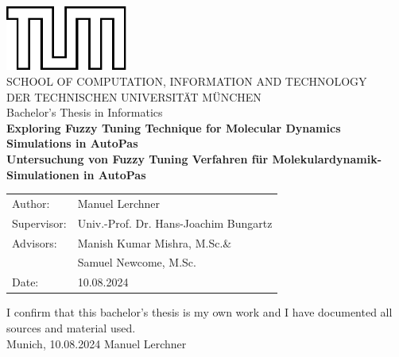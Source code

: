 \documentclass[11pt,
               a4paper,
               bibtotoc,
               idxtotoc,
               headsepline,
               footsepline,
               footexclude,
               BCOR12mm,
               DIV13,
               openany,   %
               ]
               {scrbook}
\def\doctype{Bachelor's Thesis\xspace}
\def\studyProgram{Informatics}
\def\title{Exploring Fuzzy Tuning Technique for Molecular Dynamics Simulations in AutoPas}
\def\titleGer{Untersuchung von Fuzzy Tuning Verfahren für Molekulardynamik-Simulationen in AutoPas}
\def\author{Manuel Lerchner}
\def\supervisor{Univ.-Prof. Dr. Hans-Joachim Bungartz}
\def\advisorFst{Manish Kumar Mishra, M.Sc.}
\def\advisorSnd{Samuel Newcome, M.Sc.}
\def\date{10.08.2024}
\begin{document}
\def\bcorcor{0.15cm}
\addtolength{\hoffset}{\bcorcor}
\thispagestyle{empty}
\vspace{10mm}
\begin{center}
    \includegraphics[width=4cm]{templateStuff/tumlogo.pdf}\\[5mm]
    \huge SCHOOL OF COMPUTATION, INFORMATION AND TECHNOLOGY\\[5mm]
    \large DER TECHNISCHEN UNIVERSITÄT MÜNCHEN\\[24mm]
    {\Large \doctype in \studyProgram}\\[20mm]
      {\LARGE\textbf{\title}}\\[10mm]
    {\LARGE\textbf{\titleGer}}\\[10mm]
    \begin{tabular}{ll}
        \Large Author:     & \Large \author                     \\[2mm]
        \Large Supervisor: & \Large \supervisor                 \\[2mm]
        \Large Advisors:   & \Large \advisorFst \nobreakspace\& \\[2mm]
        \Large             & \Large \advisorSnd                 \\[2mm]
        \Large Date:       & \Large \date
    \end{tabular}

\end{center}

\addtolength{\hoffset}{\bcorcor}
\newpage


\cleardoubleemptypage

\thispagestyle{empty}
\vspace*{0.7\textheight}
\noindent
I confirm that this \MakeLowercase{\doctype} is my own work and I have documented all sources and material used.\\

\vspace{15mm}
\noindent
Munich, \date \hspace{5cm} \author
\cleardoubleemptypage
\end{document}
